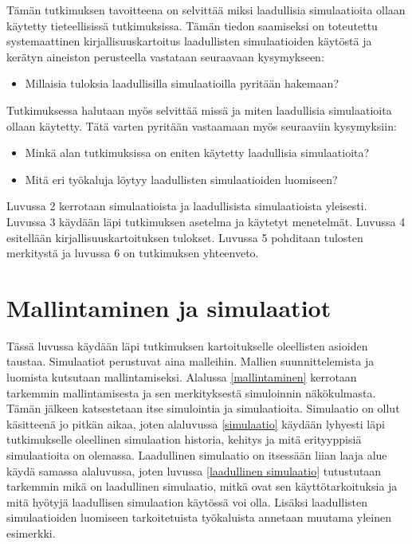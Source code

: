 \documentclass[utf8]{gradu3}
\begin{document}
Tämän tutkimuksen tavoitteena on selvittää miksi laadullisia simulaatioita 
ollaan käytetty tieteellisissä tutkimuksissa. Tämän tiedon saamiseksi on
toteutettu systemaattinen kirjallisuuskartoitus 
laadullisten simulaatioiden käytöstä ja kerätyn aineiston perusteella vastataan 
seuraavaan kysymykseen:
\begin{itemize}
    \item Millaisia tuloksia laadullisilla simulaatioilla pyritään hakemaan?
\end{itemize}

Tutkimuksessa halutaan myös selvittää missä ja miten laadullisia simulaatioita
ollaan käytetty. Tätä varten pyritään vastaamaan myös seuraaviin kysymyksiin:
\begin{itemize}
    \item Minkä alan tutkimuksissa on eniten käytetty laadullisia simulaatioita?
    \item Mitä eri työkaluja löytyy laadullisten simulaatioiden luomiseen?
\end{itemize}

Luvussa 2 kerrotaan simulaatioista ja laadullisista simulaatioista yleisesti. Luvussa 3 käydään läpi tutkimuksen asetelma ja käytetyt menetelmät. Luvussa 4 esitellään kirjallisuuskartoituksen tulokset. Luvussa 5 pohditaan tulosten merkitystä ja luvussa 6 on tutkimuksen yhteenveto.

\chapter{Mallintaminen ja simulaatiot}
Tässä luvussa käydään läpi tutkimuksen kartoitukselle oleellisten asioiden taustaa. 
Simulaatiot perustuvat aina malleihin. Mallien suunnittelemista ja luomista 
kutsutaan mallintamiseksi. Alalussa \ref{mallintaminen} kerrotaan tarkemmin 
mallintamisesta ja sen merkityksestä simuloinnin näkökulmasta. 
Tämän jälkeen katsestetaan itse simulointia ja simulaatioita.
Simulaatio on ollut käsitteenä jo pitkän aikaa, joten alaluvussa
\ref{simulaatio} käydään lyhyesti läpi tutkimukselle oleellinen simulaation historia, 
kehitys ja mitä erityyppisiä simulaatioita on olemassa. 
Laadullinen simulaatio on itsessään liian laaja alue käydä samassa alaluvussa, joten
luvussa \ref{laadullinen simulaatio} tutustutaan tarkemmin 
mikä on laadullinen simulaatio, mitkä ovat sen käyttötarkoituksia 
ja mitä hyötyjä laadullisen simulaation käytössä voi olla. 
Lisäksi laadullisten simulaatioiden luomiseen tarkoitetuista työkaluista annetaan 
muutama yleinen esimerkki.
\end{document}
